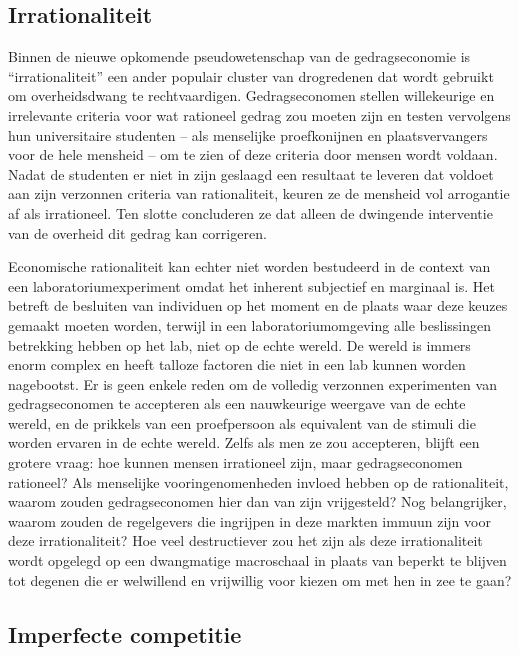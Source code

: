 \subsection{Irrationaliteit}

Binnen de nieuwe opkomende pseudowetenschap van de gedragseconomie is ``irrationaliteit'' een ander populair cluster van drogredenen dat wordt gebruikt om overheidsdwang te rechtvaardigen. Gedragseconomen stellen willekeurige en irrelevante criteria voor wat rationeel gedrag zou moeten zijn en testen vervolgens hun universitaire studenten -- als menselijke proefkonijnen en plaatsvervangers voor de hele mensheid -- om te zien of deze criteria door mensen wordt voldaan. Nadat de studenten er niet in zijn geslaagd een resultaat te leveren dat voldoet aan zijn verzonnen criteria van rationaliteit, keuren ze de mensheid vol arrogantie af als irrationeel. Ten slotte concluderen ze dat alleen de dwingende interventie van de overheid dit gedrag kan corrigeren.

Economische rationaliteit kan echter niet worden bestudeerd in de context van een laboratoriumexperiment omdat het inherent subjectief en marginaal is. Het betreft de besluiten van individuen op het moment en de plaats waar deze keuzes gemaakt moeten worden, terwijl in een laboratoriumomgeving alle beslissingen betrekking hebben op het lab, niet op de echte wereld. De wereld is immers enorm complex en heeft talloze factoren die niet in een lab kunnen worden nagebootst. Er is geen enkele reden om de volledig verzonnen experimenten van gedragseconomen te accepteren als een nauwkeurige weergave van de echte wereld, en de prikkels van een proefpersoon als equivalent van de stimuli die worden ervaren in de echte wereld. Zelfs als men ze zou accepteren, blijft een grotere vraag: hoe kunnen mensen irrationeel zijn, maar gedragseconomen rationeel? Als menselijke vooringenomenheden invloed hebben op de rationaliteit, waarom zouden gedragseconomen hier dan van zijn vrijgesteld? Nog belangrijker, waarom zouden de regelgevers die ingrijpen in deze markten immuun zijn voor deze irrationaliteit? Hoe veel destructiever zou het zijn als deze irrationaliteit wordt opgelegd op een dwangmatige macroschaal in plaats van beperkt te blijven tot degenen die er welwillend en vrijwillig voor kiezen om met hen in zee te gaan?

\subsection{Imperfecte competitie}

